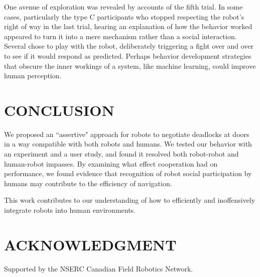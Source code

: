 \documentclass[letterpaper, 10 pt, conference]{ieeeconf}  %
\begin{document}

One avenue of exploration was revealed by accounts of the fifth trial. In some cases, particularly the type C participants who stopped respecting the robot's right of way in the last trial, hearing an explanation of how the behavior worked appeared to turn it into a mere mechanism rather than a social interaction. Several chose to play with the robot, deliberately triggering a fight over and over to see if it would respond as predicted. Perhaps behavior development strategies that obscure the inner workings of a system, like machine learning, could improve human perception.

\section{CONCLUSION}

We proposed an ``assertive" approach for robots to negotiate deadlocks at doors in a way compatible with both robots and humans. We tested our behavior with an experiment and a user study, and found it resolved both robot-robot and human-robot impasses. By examining what effect cooperation had on performance, we found evidence that recognition of robot social participation by humans may contribute to the efficiency of navigation.

This work contributes to our understanding of how to efficiently and inoffensively integrate robots into human environments. 

\section*{ACKNOWLEDGMENT}

Supported by the NSERC Canadian Field Robotics Network.




\end{document}

